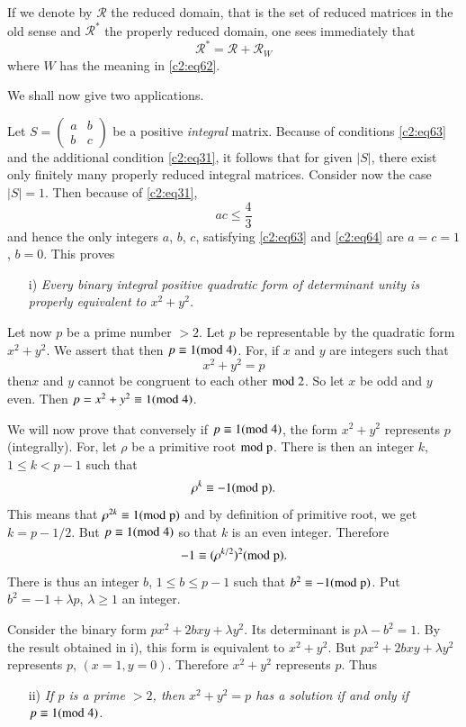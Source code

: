 If we denote by $\mathscr{R}$ the reduced domain, that is the set of
reduced matrices in the old sense and $\mathscr{R}^{\ast}$ the
properly reduced domain, one sees immediately that
$$
\mathscr{R}^{\ast}=\mathscr{R}+\mathscr{R}_{W}
$$
where $W$ has the meaning in \eqref{c2:eq62}.

We shall now give two applications.

Let $S=\left(\begin{smallmatrix} a & b\\ b &
  c\end{smallmatrix}\right)$ be a positive {\em integral}
  matrix. Because of conditions \eqref{c2:eq63} and the additional
  condition \eqref{c2:eq31}, it follows that for given $|S|$, there exist
  only finitely many properly reduced integral matrices. Consider now
  the case $|S|=1$. Then because of \eqref{c2:eq31},
\begin{equation*}
ac\leq \frac{4}{3}\tag{64}\label{c2:eq64}
\end{equation*}
and hence the only integers $a$, $b$, $c$, satisfying \eqref{c2:eq63} and
\eqref{c2:eq64} are $a=c=1$, $b=0$. This proves
\begin{itemize}
\item[i)] {\em Every binary integral positive quadratic form of
  determinant unity is properly equivalent to $x^{2}+y^{2}$.}
\end{itemize}

Let now $p$ be a prime number $>2$. Let $p$ be representable by the
quadratic form $x^{2}+y^{2}$. We assert that then $p \equiv 1(\rm{mod} \; 4)$. For,
if $x$ and $y$ are integers such that
$$
x^{2}+y^{2}=p
$$
then\pageoriginale $x$ and $y$ cannot be congruent to each other $\rm{mod} \;
2$. So let $x$ be odd and $y$ even. Then $p=x^{2}+y^{2}\equiv 1(\rm{mod} \;
4)$.

We will now prove that conversely if $p\equiv 1(\rm{mod} \; 4)$, the form
$x^{2}+y^{2}$ represents $p$ (integrally). For, let $\rho$ be a
primitive root $\rm{mod} \; p$. There is then an integer $k$, $1\leq k<p-1$
such that
$$
\rho^{k}\equiv -1(\rm{mod} \; p).
$$
This means that $\rho^{2k}\equiv 1(\rm{mod} \; p)$ and by definition of
primitive root, we get $k=p-1/2$. But $p\equiv 1(\rm{mod} \; 4)$ so that $k$
is an even integer. Therefore
$$
-1\equiv (\rho^{k/2})^{2}(\rm{mod} \; p).
$$
There is thus an integer $b$, $1\leq b\leq p-1$ such that $b^{2}\equiv
-1(\rm{mod} \; p)$. Put $b^{2}=-1+\lambda p$, $\lambda \geq 1$ an integer.

Consider the binary form $px^{2}+2bxy+\lambda y^{2}$. Its determinant
is $p\lambda-b^{2}=1$. By the result obtained in i), this form is
equivalent to $x^{2}+y^{2}$. But $px^{2}+2bxy+\lambda y^{2}$
represents $p$, $(x=1,y=0)$. Therefore $x^{2}+y^{2}$ represents
$p$. Thus
\begin{itemize}
\item[ii)] {\em If $p$ is a prime $>2$, then $x^{2}+y^{2}=p$ has a
  solution if and only if $p\equiv 1(\rm{mod} \;  4)$.}
\end{itemize}

